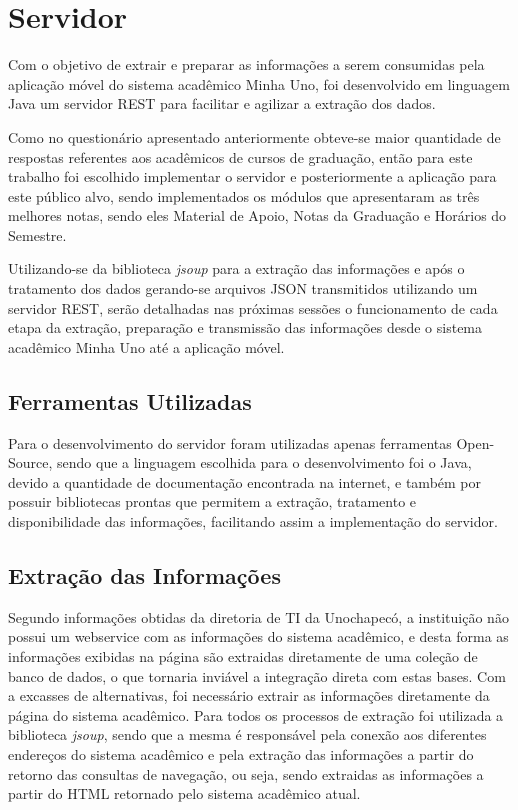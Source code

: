 \chapter{Servidor}
Com o objetivo de extrair e preparar as informações a serem consumidas pela aplicação móvel do sistema acadêmico Minha Uno, foi desenvolvido em linguagem Java um servidor REST para facilitar e agilizar a extração dos dados. 

Como no questionário apresentado anteriormente obteve-se maior quantidade de respostas referentes aos acadêmicos de cursos de graduação, então para este trabalho foi escolhido implementar o servidor e posteriormente a aplicação para este público alvo, sendo implementados os módulos que apresentaram as três melhores notas, sendo eles Material de Apoio, Notas da Graduação e Horários do Semestre.

Utilizando-se da biblioteca \emph{jsoup} para a extração das informações e após o tratamento dos dados gerando-se arquivos JSON transmitidos utilizando um servidor REST, serão detalhadas nas próximas sessões o funcionamento de cada etapa da extração, preparação e transmissão das informações desde o sistema acadêmico Minha Uno até a aplicação móvel.

\section{Ferramentas Utilizadas}
Para o desenvolvimento do servidor foram utilizadas apenas ferramentas Open-Source, sendo que a linguagem escolhida para o desenvolvimento foi o Java, devido a quantidade de documentação encontrada na internet, e também por possuir bibliotecas prontas que permitem a extração, tratamento e disponibilidade das informações, facilitando assim a implementação do servidor.

\section{Extração das Informações}

Segundo informações obtidas da diretoria de TI da Unochapecó, a instituição não possui um webservice com as informações do sistema acadêmico, e desta forma as informações exibidas na página são extraidas diretamente de uma coleção de banco de dados, o que tornaria inviável a integração direta com estas bases. Com a excasses de alternativas, foi necessário extrair as informações diretamente da página do sistema acadêmico. Para todos os processos de extração foi utilizada a biblioteca \emph{jsoup}, sendo que a mesma é responsável pela conexão aos diferentes endereços do sistema acadêmico e pela extração das informações a partir do retorno das consultas de navegação, ou seja, sendo extraidas as informações a partir do HTML retornado pelo sistema acadêmico atual.

